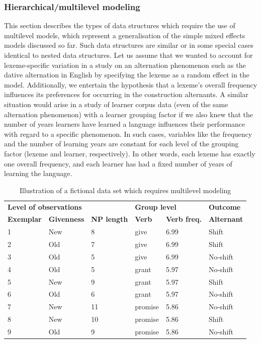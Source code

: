 \subsubsection{Hierarchical\slash multilevel modeling}
\label{sec:hierarchicalormultilevelmodels}

This section describes the types of data structures which require the use of multilevel models, which represent a generalisation of the simple mixed effects models discussed so far.
Such data structures are similar or in some special cases identical to nested data structures.
Let us assume that we wanted to account for lexeme-specific variation in a study on an alternation phenomenon such as the dative alternation in English by specifying the lexeme as a random effect in the model.
Additionally, we entertain the hypothesis that a lexeme's overall frequency influences its preferences for occurring in the construction alternants.
A similar situation would arise in a study of learner corpus data (even of the same alternation phenomenon) with a learner grouping factor if we also knew that the number of years learners have learned a language influences their performance with regard to a specific phenomenon.
In such cases, variables like the frequency and the number of learning years are constant for each level of the grouping factor (lexeme and learner, respectively).
In other words, each lexeme has exactly one overall frequency, and each learner has had a fixed number of years of learning the language.

\begin{table}
  \centering
  \caption{Illustration of a fictional data set which requires multilevel modeling}
  \begin{tabular}{llllll}
    \toprule
    \multicolumn{3}{l}{\textbf{Level of observations}}          & \multicolumn{2}{l}{\textbf{Group level}}  & \textbf{Outcome} \\
    \textbf{Exemplar} & \textbf{Givenness} & \textbf{NP length} & \textbf{Verb} & \textbf{Verb freq.}       & \textbf{Alternant}\\
    \midrule
            1 &     New   &      8    &    give   &   6.99   & Shift \\
            2 &     Old   &      7    &    give   &   6.99   & Shift \\
            3 &     Old   &      5    &    give   &   6.99   & No-shift \\
            4 &     Old   &      5    &    grant  &   5.97   & No-shift \\
            5 &     New   &      9    &    grant  &   5.97   & Shift \\
            6 &     Old   &      6    &    grant  &   5.97   & No-shift \\
            7 &     New   &      11   &   promise &   5.86   & No-shift \\
            8 &     New   &      10   &   promise &   5.86   & Shift \\
            9 &     Old   &      9    &   promise &   5.86   & No-shift \\
    \bottomrule
  \end{tabular}
  \label{tab:multilevel}
\end{table}

